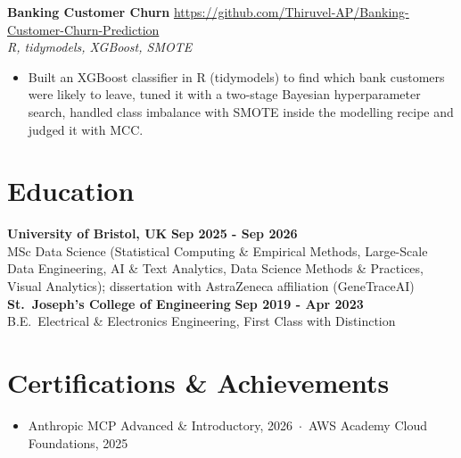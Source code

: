 \documentclass[a4paper,11pt]{article}
\begin{document}
\vspace{6pt}

\noindent\textbf{Banking Customer Churn}
\hfill \url{https://github.com/Thiruvel-AP/Banking-Customer-Churn-Prediction}
\\
\textit{R, tidymodels, XGBoost, SMOTE}
\begin{itemize}
    \item Built an XGBoost classifier in R (tidymodels) to find which bank customers were likely to leave, tuned it with a two-stage Bayesian hyperparameter search, handled class imbalance with SMOTE inside the modelling recipe and judged it with MCC.
\end{itemize}

\section{Education}
\vspace{2pt}
\noindent\textbf{University of Bristol, UK} \hfill \textbf{Sep 2025 - Sep 2026} \\ MSc Data Science (Statistical Computing \& Empirical Methods, Large-Scale Data Engineering, AI \& Text Analytics, Data Science Methods \& Practices, Visual Analytics); dissertation with AstraZeneca affiliation (GeneTraceAI)
\vspace{6pt}
\\
\textbf{St.\ Joseph's College of Engineering} \hfill   \textbf{Sep 2019 - Apr 2023} \\ B.E.\ Electrical \& Electronics Engineering, First Class with Distinction

\section{Certifications \& Achievements}
\vspace{2pt}

\begin{itemize}
    \item Anthropic MCP Advanced \& Introductory, 2026 \,$\cdot$\, AWS Academy Cloud Foundations, 2025
\end{itemize}
\end{document}
